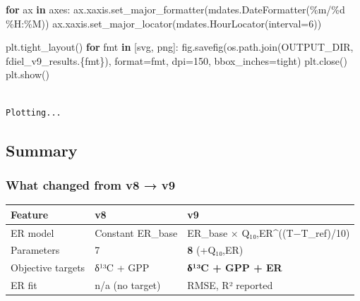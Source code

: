 \documentclass[
  letterpaper,
  DIV=11,
  numbers=noendperiod]{scrartcl}
\newenvironment{Shaded}{\begin{snugshade}}{\end{snugshade}}
\newcommand{\BuiltInTok}[1]{\textcolor[rgb]{0.00,0.23,0.31}{#1}}
\newcommand{\ControlFlowTok}[1]{\textcolor[rgb]{0.00,0.23,0.31}{\textbf{#1}}}
\newcommand{\DecValTok}[1]{\textcolor[rgb]{0.68,0.00,0.00}{#1}}
\newcommand{\KeywordTok}[1]{\textcolor[rgb]{0.00,0.23,0.31}{\textbf{#1}}}
\newcommand{\NormalTok}[1]{\textcolor[rgb]{0.00,0.23,0.31}{#1}}
\newcommand{\OperatorTok}[1]{\textcolor[rgb]{0.37,0.37,0.37}{#1}}
\newcommand{\SpecialCharTok}[1]{\textcolor[rgb]{0.37,0.37,0.37}{#1}}
\newcommand{\SpecialStringTok}[1]{\textcolor[rgb]{0.13,0.47,0.30}{#1}}
\newcommand{\StringTok}[1]{\textcolor[rgb]{0.13,0.47,0.30}{#1}}
\newcounter{none} %
\begin{document}
\begin{Shaded}
\begin{Highlighting}[]
\ControlFlowTok{for}\NormalTok{ ax }\KeywordTok{in}\NormalTok{ axes:}
\NormalTok{    ax.xaxis.set\_major\_formatter(mdates.DateFormatter(}\StringTok{\textquotesingle{}\%m/}\SpecialCharTok{\%d}\StringTok{ \%H:\%M\textquotesingle{}}\NormalTok{))}
\NormalTok{    ax.xaxis.set\_major\_locator(mdates.HourLocator(interval}\OperatorTok{=}\DecValTok{6}\NormalTok{))}

\NormalTok{plt.tight\_layout()}
\ControlFlowTok{for}\NormalTok{ fmt }\KeywordTok{in}\NormalTok{ [}\StringTok{\textquotesingle{}svg\textquotesingle{}}\NormalTok{, }\StringTok{\textquotesingle{}png\textquotesingle{}}\NormalTok{]:}
\NormalTok{    fig.savefig(os.path.join(OUTPUT\_DIR, }\SpecialStringTok{f\textquotesingle{}diel\_v9\_results.}\SpecialCharTok{\{}\NormalTok{fmt}\SpecialCharTok{\}}\SpecialStringTok{\textquotesingle{}}\NormalTok{),}
                \BuiltInTok{format}\OperatorTok{=}\NormalTok{fmt, dpi}\OperatorTok{=}\DecValTok{150}\NormalTok{, bbox\_inches}\OperatorTok{=}\StringTok{\textquotesingle{}tight\textquotesingle{}}\NormalTok{)}
\NormalTok{plt.close()}
\NormalTok{plt.show()}
\end{Highlighting}
\end{Shaded}

\begin{verbatim}

Plotting...
\end{verbatim}

\subsection{Summary}\label{summary}

\subsubsection{What changed from v8 → v9}\label{what-changed-from-v8-v9}

{\def\LTcaptype{none} %
\begin{longtable}[]{@{}lll@{}}
\toprule\noalign{}
Feature & v8 & v9 \\
\midrule\noalign{}
\endhead
\bottomrule\noalign{}
\endlastfoot
ER model & Constant ER\_base & ER\_base × Q₁₀,ER\^{}((T−T\_ref)/10) \\
Parameters & 7 & \textbf{8} (+Q₁₀,ER) \\
Objective targets & δ¹³C + GPP & \textbf{δ¹³C + GPP + ER} \\
ER fit & n/a (no target) & RMSE, R² reported \\
\end{longtable}
}
\end{document}
